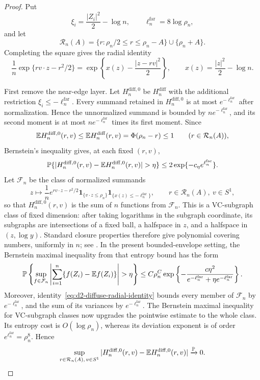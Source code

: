 \begin{proof}
Put
\[
    \xi_i=\frac{|Z_i|^2}{2}-\log n,\qquad \ell_n^{\mathrm{far}}=8\log\rho_n,
\]
and let
\[
    \mathcal R_n(A)=\{r:\rho_n/2\le r\le \rho_n-A\}\cup\{\rho_n+A\}.
\]
Completing the square gives the radial identity
\begin{equation}
\label{eq:d2-diffuse-radial-identity}
    \frac1n\exp\{rv\cdot z-r^2/2\}
    =
    \exp\left\{x(z)-\frac{|z-rv|^2}{2}\right\},
    \qquad
    x(z)=\frac{|z|^2}{2}-\log n .
\end{equation}

First remove the near-edge layer. Let \(H_n^{\mathrm{diff},0}\) be
\(H_n^{\mathrm{diff}}\) with the additional restriction
\(\xi_i\le -\ell_n^{\mathrm{far}}\). Every summand retained in
\(H_n^{\mathrm{diff},0}\) is at most
\(e^{-\ell_n^{\mathrm{far}}}\) after normalization. Hence the unnormalized summand is bounded
by \(ne^{-\ell_n^{\mathrm{far}}}\), and its second moment is at most \(ne^{-\ell_n^{\mathrm{far}}}\) times its
first moment.  Since
\[
    \mathbb E H_n^{\mathrm{diff},0}(r,v)
    \le \mathbb E H_n^{\mathrm{diff}}(r,v)=\Phi(\rho_n-r)\le1
    \qquad (r\in\mathcal R_n(A)),
\]
Bernstein's inequality gives, at each fixed \((r,v)\),
\[
    \Pbb\{|H_n^{\mathrm{diff},0}(r,v)
                 -\E H_n^{\mathrm{diff},0}(r,v)|>\eta\}
    \le 2\exp\{-c_\eta e^{\ell_n^{\mathrm{far}}}\}.
\]
Let \(\mathcal F_n\) be the class of normalized summands
\[
    z\mapsto \frac1n e^{rv\cdot z-r^2/2}
        \mathbf 1_{\{v\cdot z\le\rho_n\}}
        \mathbf 1_{\{x(z)\le -\ell_n^{\mathrm{far}}\}},
    \qquad r\in\mathcal R_n(A),\ v\in S^1,
\]
so that \(H_n^{\mathrm{diff},0}(r,v)\) is the sum of \(n\) functions from
\(\mathcal F_n\). This is a VC-subgraph class of fixed dimension: after taking
logarithms in the subgraph coordinate, its subgraphs are intersections of a
fixed ball, a halfspace in \(z\), and a halfspace in \((z,\log y)\).
Standard closure properties therefore give polynomial covering numbers,
uniformly in \(n\); see
\cite[Sections~2.6.2 and~2.14.1]{vanderVaartWellner1996}. In the present
bounded-envelope setting, the Bernstein maximal inequality from that entropy
bound has the form
\[
 \Pbb\left\{\sup_{f\in\mathcal F_n}
   \left|\sum_{i=1}^n\{f(Z_i)-\E f(Z_i)\}\right|>\eta\right\}
 \le C\rho_n^C
 \exp\left\{-\frac{c\eta^2}
 {e^{-\ell_n^{\mathrm{far}}}+\eta e^{-\ell_n^{\mathrm{far}}}}\right\}.
\]
Moreover, identity~\eqref{eq:d2-diffuse-radial-identity}
bounds every member of \(\mathcal F_n\) by \(e^{-\ell_n^{\mathrm{far}}}\), and
the sum of its variances by \(e^{-\ell_n^{\mathrm{far}}}\). The Bernstein maximal inequality for
VC-subgraph classes now upgrades the pointwise estimate to the whole class.
Its entropy cost is \(O(\log\rho_n)\), whereas its deviation exponent is of
order \(e^{\ell_n^{\mathrm{far}}}=\rho_n^8\). Hence
\[
    \sup_{r\in\mathcal R_n(A),\,v\in S^1}
    |H_n^{\mathrm{diff},0}(r,v)-\mathbb E H_n^{\mathrm{diff},0}(r,v)|
    \xrightarrow{\mathbb P}0 .
\]


\end{proof}

